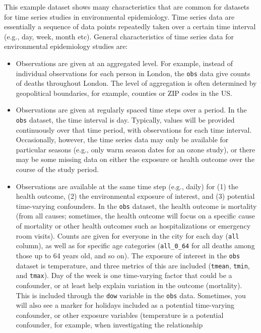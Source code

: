 \documentclass[
]{book}
\providecommand{\tightlist}{%
  \setlength{\itemsep}{0pt}\setlength{\parskip}{0pt}}
\begin{document}
This example dataset shows many characteristics that are common for datasets for
time series studies in environmental epidemiology. Time series data are essentially
a sequence of data points repeatedly taken over a certain time interval (e.g., day,
week, month etc). General characteristics of time series data for environmental epidemiology studies are:

\begin{itemize}
\tightlist
\item
  Observations are given at an aggregated level. For example, instead of
  individual observations for each person in London, the \texttt{obs} data give
  counts of deaths throughout London. The level of aggregation is often determined
  by geopolitical boundaries, for example, counties or ZIP codes in the US.
\item
  Observations are given at regularly spaced time steps over a period. In the
  \texttt{obs} dataset, the time interval is day. Typically, values will be provided
  continuously over that time period, with observations for each time interval.
  Occasionally, however, the time series data may only be available for
  particular seasons (e.g., only warm season dates for an ozone study), or
  there may be some missing data on either the exposure or health outcome over
  the course of the study period.
\item
  Observations are available at the same time step (e.g., daily) for (1) the health outcome, (2) the environmental
  exposure of interest, and (3) potential time-varying confounders. In the \texttt{obs}
  dataset, the health outcome is mortality (from all causes; sometimes, the health
  outcome will focus on a specific cause of mortality or other health outcomes such
  as hospitalizations or emergency room visits). Counts are given for everyone in
  the city for each day (\texttt{all} column), as well as for specific age categories
  (\texttt{all\_0\_64} for all deaths among those up to 64 years old, and so on). The
  exposure of interest in the \texttt{obs} dataset is temperature, and three metrics of
  this are included (\texttt{tmean}, \texttt{tmin}, and \texttt{tmax}). Day of the week is one
  time-varying factor that could be a confounder, or at least help explain
  variation in the outcome (mortality). This is included through the \texttt{dow} variable
  in the \texttt{obs} data. Sometimes, you will also see a marker for holidays included
  as a potential time-varying confounder, or other exposure variables (temperature
  is a potential confounder, for example, when investigating the relationship

\end{itemize}
\end{document}
